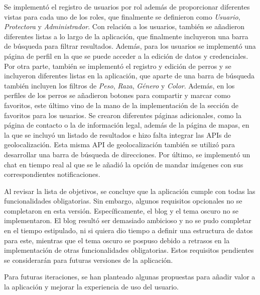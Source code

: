 \documentclass[a4paper, 12pt]{article}
\begin{document}
Se implementó el registro de usuarios por rol además de proporcionar diferentes vistas para cada uno de los roles, que finalmente se definieron como \textit{Usuario},  \textit{Protectora}  y   \textit{Administrador}.  Con relación a los usuarios, también se añadieron diferentes listas a lo largo de la aplicación, que finalmente incluyeron una barra de búsqueda para filtrar resultados. Además, para los usuarios se implementó una página de perfil en la que se puede acceder a la edición de datos y credenciales. Por otra parte, también se implementó el registro y edición de perros y se incluyeron diferentes listas en la aplicación, que aparte de una barra de búsqueda también incluyen los filtros de  \textit{Peso},  \textit{Raza},  \textit{Género} y  \textit{Color}. Además, en los perfiles de los perros se añadieron botones para compartir y marcar como favoritos, este último vino de la mano de la implementación de la sección de favoritos para los usuarios. Se crearon diferentes páginas adicionales, como la página de contacto o la de información legal, además de la página de mapas, en la que se incluyó un listado de resultados e hizo falta integrar las APIs de geolocalización. Esta misma API de geolocalización también se utilizó para desarrollar una barra de búsqueda de direcciones. Por último, se implementó un chat en tiempo real al que se le añadió la opción de mandar imágenes con sus correspondientes notificaciones.

Al revisar la lista de objetivos, se concluye que la aplicación cumple con todas las funcionalidades obligatorias. Sin embargo, algunos requisitos opcionales no se completaron en esta versión. Específicamente, el blog y el tema oscuro no se implementaron. El blog resultó ser demasiado ambicioso y no se pudo completar en el tiempo estipulado, ni si quiera dio tiempo a definir una estructura de datos para este, mientras que el tema oscuro se pospuso debido a retrasos en la implementación de otras funcionalidades obligatorias. Estos requisitos pendientes se considerarán para futuras versiones de la aplicación.

Para futuras iteraciones, se han planteado algunas propuestas para añadir valor a la aplicación y mejorar la experiencia de uso del usuario.
\end{document}
